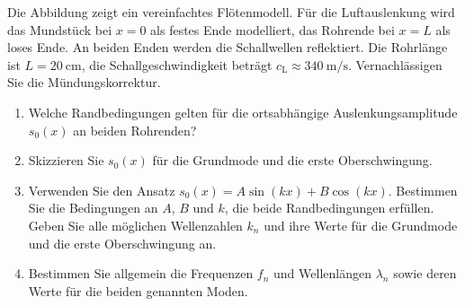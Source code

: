 \begin{ExerciseBlock}
Die Abbildung zeigt ein vereinfachtes Flötenmodell. Für die Luftauslenkung wird das Mundstück bei $x=0$ als festes Ende modelliert, das Rohrende bei $x=L$ als loses Ende. An beiden Enden werden die Schallwellen reflektiert. Die Rohrlänge ist $L=\qty{20}{\centi\metre}$, die Schallgeschwindigkeit beträgt $c_\mathrm L\approx\qty{340}{\metre\per\second}$. Vernachlässigen Sie die Mündungskorrektur.
\begin{center}
\end{center}
\begin{enumerate}
\item Welche Randbedingungen gelten für die ortsabhängige Auslenkungsamplitude $s_0(x)$ an beiden Rohrenden?
\item Skizzieren Sie $s_0(x)$ für die Grundmode und die erste Oberschwingung.
\item Verwenden Sie den Ansatz $s_0(x)=A\sin(kx)+B\cos(kx)$. Bestimmen Sie die Bedingungen an $A$, $B$ und $k$, die beide Randbedingungen erfüllen. Geben Sie alle möglichen Wellenzahlen $k_n$ und ihre Werte für die Grundmode und die erste Oberschwingung an.
\item Bestimmen Sie allgemein die Frequenzen $f_n$ und Wellenlängen $\lambda_n$ sowie deren Werte für die beiden genannten Moden.
\end{enumerate}
\end{ExerciseBlock}
